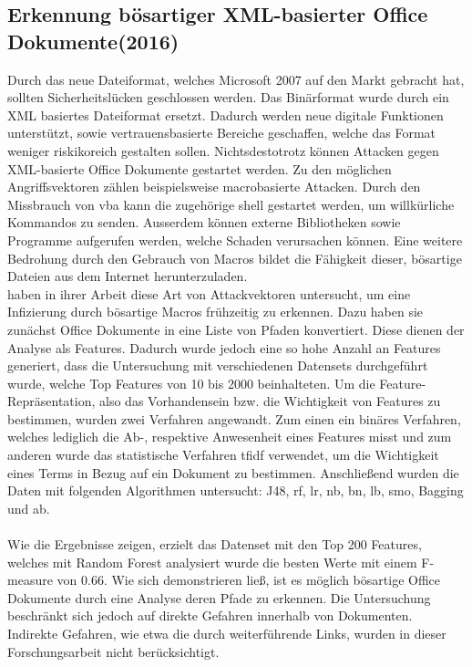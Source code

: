 \documentclass[
    12pt, %
    DIV10,
    ngerman, %
    a4paper, %
    oneside, %
    titlepage, %
    parskip=half, %
    headings=normal, %
    listof=totoc, %
    bibliography=totoc, %
    index=totoc, %
    captions=tableheading, %
    final %
]{scrreprt}
\begin{document}
\subsection{Erkennung bösartiger XML-basierter Office Dokumente(2016)}
Durch das neue Dateiformat, welches Microsoft 2007 auf den Markt gebracht hat, sollten Sicherheitslücken geschlossen werden.
Das Binärformat wurde durch ein	XML basiertes Dateiformat ersetzt. Dadurch werden neue digitale Funktionen unterstützt, sowie vertrauensbasierte Bereiche geschaffen, welche das Format weniger riskikoreich gestalten sollen. Nichtsdestotrotz können Attacken gegen XML-basierte Office Dokumente gestartet werden. Zu den möglichen Angriffsvektoren zählen beispielsweise macrobasierte Attacken. Durch den Missbrauch von \ac{vba} kann die zugehörige shell gestartet werden, um willkürliche Kommandos zu senden. Ausserdem können externe Bibliotheken sowie Programme aufgerufen werden, welche Schaden verursachen können. Eine weitere Bedrohung durch den Gebrauch von Macros bildet die Fähigkeit dieser, bösartige Dateien aus dem Internet herunterzuladen.\\
\textcite{Cohen2016} haben in ihrer Arbeit diese Art von Attackvektoren untersucht, um eine Infizierung durch bösartige Macros frühzeitig zu erkennen. Dazu haben sie zunächst Office Dokumente in eine Liste von Pfaden konvertiert. Diese dienen der Analyse als Features. Dadurch wurde jedoch eine so hohe Anzahl an Features generiert, dass die Untersuchung mit verschiedenen Datensets durchgeführt wurde, welche Top Features von 10 bis 2000 beinhalteten. Um die Feature-Repräsentation, also das Vorhandensein bzw. die Wichtigkeit von Features zu bestimmen, wurden zwei Verfahren angewandt. Zum einen ein binäres Verfahren, welches lediglich die Ab-, respektive Anwesenheit eines Features misst und zum anderen wurde das statistische Verfahren \ac{tfidf} verwendet, um die Wichtigkeit eines Terms in Bezug auf ein Dokument zu bestimmen. Anschließend wurden die Daten mit folgenden Algorithmen untersucht: J48, \ac{rf}, \ac{lr}, \ac{nb}, \ac{bn}, \ac{lb}, \ac{smo}, Bagging und \ac{ab}. \\\\
Wie die Ergebnisse zeigen, erzielt das Datenset mit den Top 200 Features, welches mit Random Forest analysiert wurde die besten Werte mit einem F-measure von 0.66.
Wie sich demonstrieren ließ, ist es möglich bösartige Office Dokumente durch eine Analyse deren Pfade zu erkennen. 
Die Untersuchung beschränkt sich jedoch auf direkte Gefahren innerhalb von Dokumenten. Indirekte Gefahren, wie etwa die durch weiterführende Links, wurden in dieser Forschungsarbeit nicht berücksichtigt.
\end{document}
